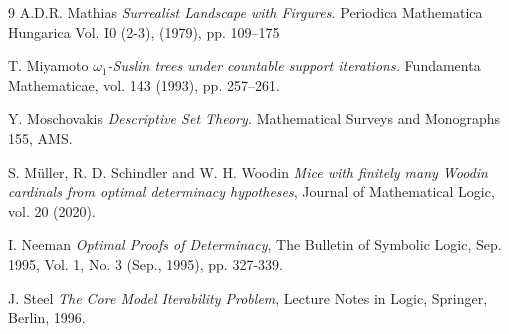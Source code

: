 \documentclass[a4paper,11pt]{article}
\begin{document}
\begin{thebibliography}{9}
A.D.R. Mathias \textit{Surrealist Landscape with Firgures.}  Periodica Mathematica Hungarica Vol. I0 (2-3), (1979), pp. 109--175

 T. Miyamoto {\em $\omega_1$-Suslin trees under countable support iterations.} Fundamenta Mathematicae,
vol. 143 (1993), pp. 257–261.

Y. Moschovakis \textit{Descriptive Set Theory.} Mathematical Surveys and Monographs 155, AMS.


 S.  M\"uller, R. D. Schindler and W. H. Woodin \textit{Mice with finitely many Woodin cardinals from optimal determinacy hypotheses}, Journal of Mathematical Logic, vol. 20 (2020).
 
 I. Neeman \textit{Optimal Proofs of Determinacy}, The Bulletin of Symbolic Logic, Sep. 1995, Vol. 1, No. 3 (Sep., 1995), pp. 327-339.

J. Steel \textit{The Core Model Iterability Problem}, Lecture Notes in Logic, Springer, Berlin, 1996.



\end{thebibliography}
\end{document}
